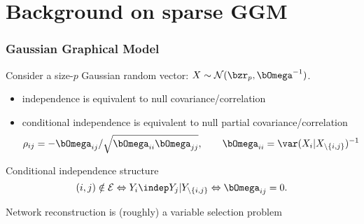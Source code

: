 \section{Background on sparse GGM}

\begin{frame}
  \frametitle{\alert{Gaussian} Graphical Model}

  Consider a size-$p$ Gaussian random vector:
  $X\sim\mathcal{N}(\bzr_p,\invcov^{-1})$.

  \begin{itemize}
  \item independence is equivalent to null covariance/correlation
  \item  \alert{  conditional  independence is  equivalent  to  null
      partial covariance/correlation}
    \begin{equation*}
      \label{eq:parcor2invcov}
      \rho_{ij}      =  -\invcov_{ij}      /
      \sqrt{\invcov_{ii} \invcov_{jj}}, \qquad \invcov_{ii}=
      \var(X_i|X_{\backslash \{i,j\}})^{-1}
    \end{equation*}
  \end{itemize}


  \begin{block}{Conditional independence structure}
    \vspace{-.5cm}
    \begin{equation*}
      (i,j)  \notin  \mathcal{E}  \Leftrightarrow  Y_i  \indep  Y_j  |
      Y_{\backslash \{i,j\}} \Leftrightarrow \invcov_{ij} = 0.
    \end{equation*}
  \end{block}

  \vspace{-.5cm}
  \vspace{-.5cm}

  \rsa Network reconstruction is (roughly) a variable selection problem
\end{frame}

